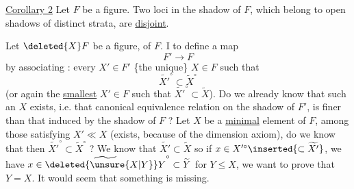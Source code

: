 \uline{Corollary 2} Let $F$ be a figure. Two loci in  the shadow of $F$, which belong to open shadows of distinct strata, are \uline{disjoint}.

Let $\deleted{X}F$ be a figure,   of $F$. I  to define a map
\[
 F'\longrightarrow F
\]
by associating : every $X'\in F'$ \{the unique\} $X\in F$ such that
\[
 \widetilde{X'}^\circ\subset\widetilde X^\circ
\]
(or again the \uline{smallest}  $X'\in F$ such that $\widetilde{X'}^\circ\subset\widetilde X$). Do we already know that such an $X$ exists, i.e. that  canonical equivalence relation on the shadow of $F'$, is finer than that induced by the shadow of $F$ ? Let $X$ be a \uline{minimal} element of $F$, among those satisfying $X'\ll X$ (exists, because of the dimension axiom), do we know that then $\widetilde{X'}^\circ\subset\widetilde X^\circ$ ?  We know that $\widetilde{X'}\subset\widetilde X$ so if $x\in X'^\circ\inserted{\subset\widetilde{X'}}$, we have $x\in\widetilde{\deleted{\unsure{X|Y}}Y}^\circ\subset\widetilde Y$ for $Y\leq X$, we want to prove that $Y=X$. It would seem that something is missing.
